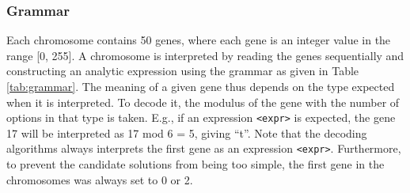 \documentclass[multicolumn, 12pt]{extarticle}
\begin{document}
\subsubsection{Grammar}
Each chromosome contains 50 genes, where each gene is an integer value in the range [0, 255]. A chromosome is interpreted by reading the genes sequentially and constructing an analytic expression using the grammar as given in Table \ref{tab:grammar}.  The meaning of a given gene thus depends on the type expected when it is interpreted. To decode it, the modulus of the gene with the number of options in that type is taken. E.g., if an expression \texttt{<expr>} is expected, the gene 17 will be interpreted as 17 mod 6 = 5, giving ``t''. Note that the decoding algorithms always interprets the first gene as an expression \texttt{<expr>}.  Furthermore, to prevent the candidate solutions from being too simple, the first gene in the chromosomes was always set to 0 or 2. 
\end{document}
